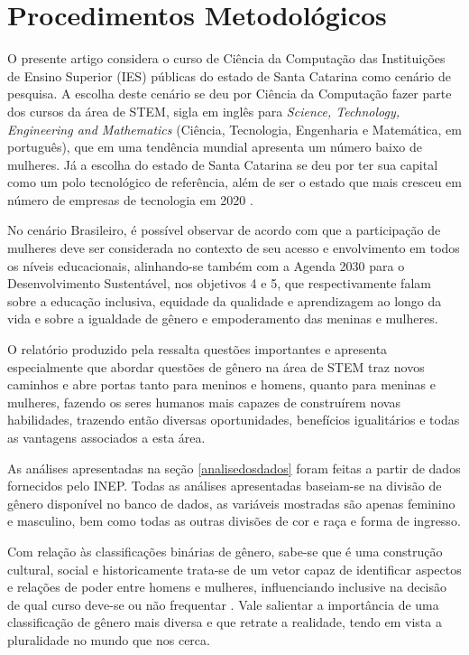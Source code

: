 \documentclass[a4paper]{article}
\begin{document}
\section{Procedimentos Metodológicos}\label{ProcedimentosMetodologicos}

O presente artigo considera o curso de Ciência da Computação das Instituições de Ensino Superior (IES) públicas do estado de Santa Catarina como cenário de pesquisa. A escolha deste cenário se deu por Ciência da Computação fazer parte dos cursos da área de STEM, sigla em inglês para \textit{Science, Technology, Engineering and Mathematics} (Ciência, Tecnologia, Engenharia e Matemática, em português), que em uma tendência mundial apresenta um número baixo de mulheres. Já a escolha do estado de Santa Catarina se deu por ter sua capital como um polo tecnológico de referência, além de ser o estado que mais cresceu em número de empresas de tecnologia em 2020 \cite{digital_2020}. %

No cenário Brasileiro, é possível observar de acordo com  que a participação de mulheres deve ser considerada no contexto de seu acesso e envolvimento em todos os níveis educacionais, alinhando-se também com a Agenda 2030 para o Desenvolvimento Sustentável, nos objetivos 4 e 5, que respectivamente falam sobre a educação inclusiva, equidade da qualidade e aprendizagem ao longo da vida e sobre a igualdade de gênero e empoderamento das meninas e mulheres.

O relatório produzido pela  ressalta questões importantes e apresenta especialmente que abordar questões de gênero na área de STEM traz novos caminhos e abre portas tanto para meninos e homens, quanto para meninas e mulheres, fazendo os seres humanos mais capazes de construírem novas habilidades, trazendo então diversas oportunidades, benefícios igualitários e todas as vantagens associados a esta área.

As análises apresentadas na seção \ref{analisedosdados} foram feitas a partir de dados fornecidos pelo INEP. Todas as análises apresentadas baseiam-se na divisão de gênero disponível no banco de dados, as variáveis mostradas são apenas feminino e masculino, bem como todas as outras divisões de cor e raça e forma de ingresso.

Com relação às classificações binárias de gênero, sabe-se que é uma construção cultural, social e historicamente trata-se de um vetor capaz de identificar aspectos e relações de poder entre homens e mulheres, influenciando inclusive na decisão de qual curso deve-se ou não frequentar . Vale salientar a importância de uma classificação de gênero mais diversa e que retrate a realidade, tendo em vista a pluralidade no mundo que nos cerca.
\end{document}
